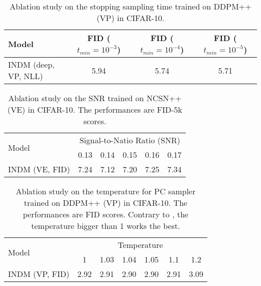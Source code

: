 \documentclass{article}
\theoremstyle{definition}
\theoremstyle{remark}
\begin{document}
	\begin{table}[t]
		\caption{Ablation study on the stopping sampling time trained on DDPM++ (VP) in CIFAR-10.}
		\label{tab:sampling_eps_search}
		\scriptsize
		\centering
		\begin{tabular}{lccc}
			\toprule
			Model & FID ($t_{min}=10^{-3}$) & FID ($t_{min}=10^{-4}$) & FID ($t_{min}=10^{-5}$)\\
			\midrule
			INDM (deep, VP, NLL) & 5.94 & 5.74 & 5.71 \\
			\bottomrule
		\end{tabular}
	\end{table}
	
	\begin{table}[t]
		\caption{Ablation study on the SNR trained on NCSN++ (VE) in CIFAR-10. The performances are FID-5k scores.}
		\label{tab:snr_search}
		\tiny
		\centering
		\begin{tabular}{lccccc}
			\toprule
			\multirow{2}{*}[-2pt]{Model} & \multicolumn{5}{c}{Signal-to-Natio Ratio (SNR)}\\\cmidrule(lr){2-6}
			& 0.13 & 0.14 & 0.15 & 0.16 & 0.17\\\midrule
			INDM (VE, FID) & 7.24 & 7.12 & 7.20 & 7.25 & 7.34 \\
			\bottomrule
		\end{tabular}
	\end{table}
	
	\begin{table}[t]
		\caption{Ablation study on the temperature for PC sampler trained on DDPM++ (VP) in CIFAR-10. The performances are FID scores. Contrary to \citet{kingma2018glow}, the temperature bigger than 1 works the best.}
		\label{tab:temperature_search}
		\tiny
		\centering
		\begin{tabular}{lcccccc}
			\toprule
			\multirow{2}{*}[-2pt]{Model} & \multicolumn{6}{c}{Temperature}\\\cmidrule(lr){2-7}
			& 1 & 1.03 & 1.04 & 1.05 & 1.1 & 1.2\\\midrule
			INDM (VP, FID) & 2.92 & 2.91 & 2.90 & 2.90 & 2.91 & 3.09 \\
			\bottomrule
		\end{tabular}
	\end{table}
	
\end{document}

